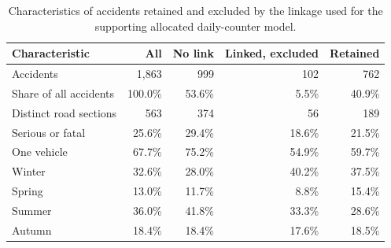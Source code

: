 \begin{table}[H]
\centering
\footnotesize
\caption[Characteristics by counter-linkage status.]{Characteristics of accidents retained and excluded by the linkage used for the supporting allocated daily-counter model.}
\label{tab:allocated-sample}

\begin{tabularx}{\textwidth}{Xrrrr}
\toprule
Characteristic & All & No link & Linked, excluded & Retained \\
\midrule
Accidents & 1,863 & 999 & 102 & 762 \\ \grayhline
Share of all accidents & 100.0\% & 53.6\% & 5.5\% & 40.9\% \\ \grayhline
Distinct road sections & 563 & 374 & 56 & 189 \\ \grayhline
Serious or fatal & 25.6\% & 29.4\% & 18.6\% & 21.5\% \\ \grayhline
One vehicle & 67.7\% & 75.2\% & 54.9\% & 59.7\% \\ \grayhline
Winter & 32.6\% & 28.0\% & 40.2\% & 37.5\% \\ \grayhline
Spring & 13.0\% & 11.7\% & 8.8\% & 15.4\% \\ \grayhline
Summer & 36.0\% & 41.8\% & 33.3\% & 28.6\% \\ \grayhline
Autumn & 18.4\% & 18.4\% & 17.6\% & 18.5\% \\
\bottomrule
\end{tabularx}
\end{table}
